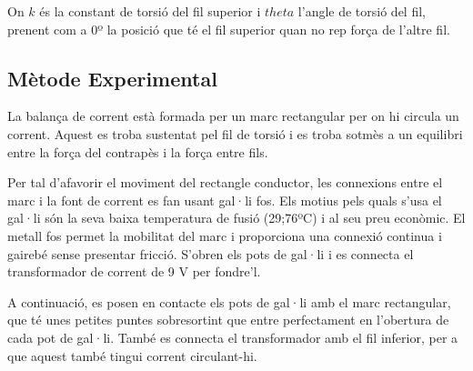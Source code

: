 \documentclass[11pt]{article}
\numberwithin{equation}{section}
\numberwithin{figure}{section}
\numberwithin{table}{section}
\begin{document}
On $k$ és la constant de torsió del fil superior i $theta$ l'angle de torsió del fil, prenent com a 0º la posició que té el fil superior quan no rep força de l'altre fil.

\subsection{Mètode Experimental}\label{sec: PR2_met_exp}

La balança de corrent està formada per un marc rectangular per on hi circula un corrent. Aquest es troba sustentat pel fil de torsió i es troba sotmès a un equilibri entre la força del contrapès i la força entre fils. 

Per tal d'afavorir el moviment del rectangle conductor, les
connexions entre el marc i la font de corrent es fan usant gal·li fos. Els motius pels quals s'usa el gal·li són la seva baixa temperatura de fusió (29;76ºC) i al seu preu econòmic. El metall fos permet la mobilitat del marc i proporciona una connexió continua i gairebé sense presentar fricció. S'obren els pots de gal·li i es connecta el transformador de corrent de 9 V per fondre'l. 

A continuació, es posen en contacte
els pots de gal·li amb el marc rectangular, que té unes petites puntes sobresortint que entre perfectament en l'obertura de cada pot de gal·li. També es connecta el transformador amb el fil inferior, per a que aquest també tingui corrent circulant-hi.

\end{document}
